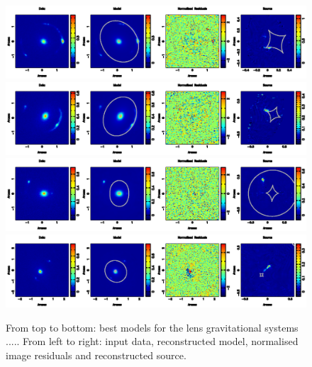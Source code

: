 \documentclass[a4paper,fleqn,usenatbib]{mnras}
\begin{document}
\begin{figure}
\begin{center} 
\includegraphics[width = 16 cm]{fig1a.ps}
\includegraphics[width = 16 cm]{fig1e.ps}
\includegraphics[width = 16 cm]{fig1g.ps}
\includegraphics[width = 16 cm]{fig1l.ps}
\caption{From top to bottom: best models for the lens gravitational systems ..... From left to right: input data, reconstructed model, normalised image residuals and reconstructed source.}
\label{fig:J0252_smooth}
\end{center}     
 \end{figure}
 
\end{document}
